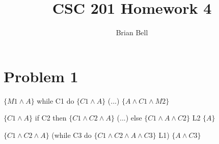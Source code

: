 \documentclass[11pt]{article}
\begin{document}
\title{CSC 201 Homework 4}
\author{Brian Bell\\
}
\renewcommand{\today}{April 28, 2009}
\maketitle
\section*{Problem 1}
\begin{description} 
\item $\{M1\wedge A\}$ while C1 do $\{C1\wedge A\}$ (...) $\{A\wedge \!C1\wedge M2\}$
\item $\{C1\wedge A\}$ if C2 then $\{C1\wedge C2\wedge A\}$ (...) else $\{C1\wedge A\wedge \!C2\}$ L2 $\{A\}$
\item $\{C1\wedge C2\wedge A\}$ (while C3 do $\{C1\wedge C2\wedge A\wedge C3\}$ L1) $\{A\wedge \!C3\}$
\end{description}
\end{document}
